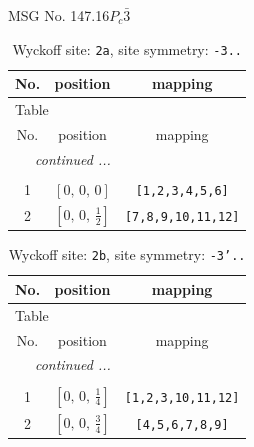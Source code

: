 \documentclass[fleqn,8pt]{jsarticle}
\begin{document}
\setcounter{MaxMatrixCols}{32}

\renewcommand{\tablename}{Table~}
\renewcommand{\figurename}{Figure~}
\begin{center}
\LARGE
MSG No. 147.16\quad$P_{c}\bar{3}$
\end{center}
\renewcommand{\arraystretch}{1.2}
\begin{longtable}{ccc}
\caption{Wyckoff site: {\tt 2a}, site symmetry: {\tt -3..}}
 \\
 \hline \hline
No. & position & mapping \\ \hline \endfirsthead

\multicolumn{2}{l}{\tablename\ \thetable{}} \\
 \hline \hline
No. & position & mapping \\ \hline \endhead

 \hline \hline
\multicolumn{2}{r}{\footnotesize\it continued ...} \\ \endfoot

 \hline \hline
\multicolumn{2}{r}{} \\ \endlastfoot

1 & $\left[ 0,\, 0,\, 0 \right]$ & {\tt [1,2,3,4,5,6]} \\ \hline
2 & $\left[ 0,\, 0,\, \frac{1}{2} \right]$ & {\tt [7,8,9,10,11,12]} \\
\end{longtable}
\renewcommand{\arraystretch}{1.2}
\begin{longtable}{ccc}
\caption{Wyckoff site: {\tt 2b}, site symmetry: {\tt -3'..}}
 \\
 \hline \hline
No. & position & mapping \\ \hline \endfirsthead

\multicolumn{2}{l}{\tablename\ \thetable{}} \\
 \hline \hline
No. & position & mapping \\ \hline \endhead

 \hline \hline
\multicolumn{2}{r}{\footnotesize\it continued ...} \\ \endfoot

 \hline \hline
\multicolumn{2}{r}{} \\ \endlastfoot

1 & $\left[ 0,\, 0,\, \frac{1}{4} \right]$ & {\tt [1,2,3,10,11,12]} \\ \hline
2 & $\left[ 0,\, 0,\, \frac{3}{4} \right]$ & {\tt [4,5,6,7,8,9]} \\
\end{longtable}
\end{document}
